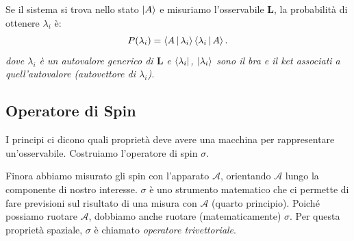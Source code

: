 \begin{principles}
	Se il sistema si trova nello stato $\Ket{A}$ e misuriamo l'osservabile $\mathbf{L}$, la probabilità di ottenere $\lambda_i$ è:
	\[
	P(\lambda_i) = \Braket{A|\lambda_i}\Braket{\lambda_i|A}.
	\]
	\emph{dove $\lambda_i$ è un autovalore generico di $\mathbf{L}$ e $\Bra{\lambda_i}$, $\Ket{\lambda_i}$ sono il bra e il ket associati a quell'autovalore (autovettore di $\lambda_i$).}
\end{principles}

\subsection{Operatore di Spin}
I principi ci dicono quali proprietà deve avere una macchina per rappresentare un'osservabile. Costruiamo l'operatore di spin $\sigma$.

Finora abbiamo misurato gli spin con l'apparato $\mathcal{A}$, orientando $\mathcal{A}$ lungo la componente di nostro interesse. $\sigma$ è uno strumento matematico che ci permette di fare previsioni sul risultato di una misura con $\mathcal{A}$ (quarto principio). Poiché possiamo ruotare $\mathcal{A}$, dobbiamo anche ruotare (matematicamente) $\sigma$. Per questa proprietà spaziale, $\sigma$ è chiamato \emph{operatore trivettoriale}.

